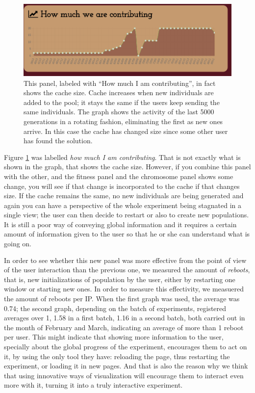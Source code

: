 \documentclass{sig-alternate}
\begin{document}
\begin{figure}[!htb]
\centering
\includegraphics[width=0.95\linewidth]{contribution.png}
\caption{This panel, labeled with ``How much I am contributing'', in
  fact shows the cache size. Cache increases when new individuals are
  added to the pool; it stays the same if the users keep sending the
  same individuals. The graph shows the activity of the last 5000
  generations in a rotating fashion, eliminating the first as new ones
  arrive. In this case the cache has changed size since some other
  user has found the solution.   \label{fig:howmuch}}
\end{figure}
%
Figure \ref{fig:howmuch} was labelled {\em how much I am
  contributing}. That is not exactly what is shown in the graph, that
shows the cache size. However, if you combine this panel with the
other, and the fitness panel and the chromosome panel shows some
change, you will see if that change is incorporated to the cache if
that changes size. If the cache remains the same, no new individuals
are being generated and again you can have a perspective of the whole
experiment being stagnated in a single view; the user can then decide
to restart or also to create new populations. It is still a poor way
of conveying global information and it requires a certain amount of
information given to the user so that he or she can understand what is
going on.

In order to see whether this new panel was more effective from the
point of view of the user interaction than the previous one, we
measured the amount of {\em reboots}, that is, new initializations of
population by the user, either by restarting one window or starting
new ones. In order to measure this effectivity, we measuered the
amount of reboots per IP. When the first graph was used, the average
was 0.74; the second graph, depending on the batch of experiments,
registered averages over 1, 1.58 in a first batch, 1.16 in a second
batch, both carried out in the month of February and March, indicating
an average of more than 1 reboot per user. This might indicate that
showing more information to the user, specially about the global
progress of the experiment, encourages them to act on it, by using the
only tool they have: reloading the page, thus restarting the
experiment, or loading it in new pages. And that is also the reason
why we think that using innovative ways of visualization will
encourage them to interact even more with it, turning it into a truly
interactive experiment. 
\end{document}
